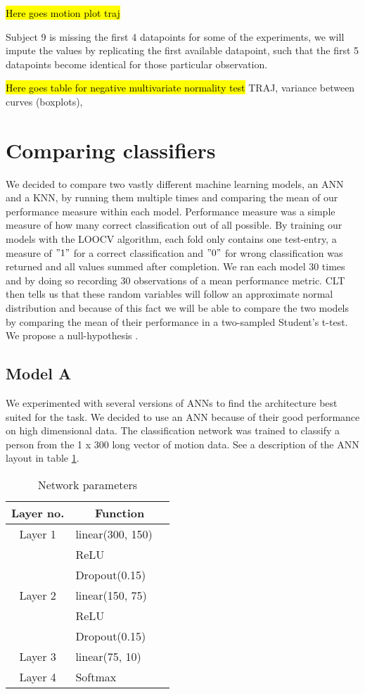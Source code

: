 \documentclass{article}
\begin{document}
\hl{Here goes motion plot traj}

Subject 9 is missing the first 4 datapoints for some of the experiments, we will impute the values by replicating the first available datapoint, such that the first 5 datapoints become identical for those particular observation.

\hl{Here goes table for negative multivariate normality test}
TRAJ, variance between curves (boxplots), 

\section{Comparing classifiers}
We decided to compare two vastly different machine learning models, an ANN and a KNN, by running them multiple times and comparing the mean of our performance measure within each model. Performance measure was a simple measure of how many correct classification out of all possible. By training our models with the LOOCV algorithm, each fold only contains one test-entry, a measure of $"1"$ for a correct classification and $"0"$ for wrong classification was returned and all values summed after completion. We ran each model 30 times and by doing so recording 30 observations of a mean performance metric. CLT then tells us that these random variables will follow an approximate normal distribution and because of this fact we will be able to compare the two models by comparing the mean of their performance in a two-sampled Student's t-test.\\



We propose a null-hypothesis . 
\subsection{Model A}
We experimented with several versions of ANNs to find the architecture best suited for the task. We decided to use an ANN because of their good performance on high dimensional data. The classification network was trained to classify a person from the 1 x 300 long vector of motion data. See a description of the ANN layout in table \ref{tab:ann}.

\begin{table}[H]
\centering
\begin{tabular}[H]{c l @{} l}
\centering
Layer no.       &
\multicolumn{2}{c}{Function} \\
\hline
Layer 1     & linear(300, 150) \\
            & ReLU \\
            & Dropout(0.15) \\
Layer 2     & linear(150, 75) \\ 
            & ReLU \\
            & Dropout(0.15) \\
Layer 3     & linear(75, 10) \\ 
Layer 4     & Softmax\\ 
\end{tabular}\\
\caption{Network parameters}
\label{tab:ann} 
\end{table}
\end{document}
